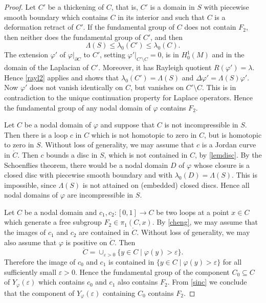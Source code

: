 \begin{proof}
Let $C'$ be a thickening of $C$,
that is, $C'$ is a domain in $S$ with piecewise smooth boundary
which contains $C$ in its interior and such that $C$ is a deformation retract of $C'$.
If the fundamental group of $C$ does not contain $F_2$,
then neither does the fundamental group of $C'$, and then
\begin{equation*}
  \Lambda(S) \le \lambda_0(C') \le \lambda_0(C).
\end{equation*}
The extension ${\varphi}'$ of ${\varphi}|_{\partial C}$ to $C'$, setting ${\varphi}'|_{C'\setminus C}=0$,
is in $H^1_0(M)$ and in the domain of the Laplacian of $C'$.
Moreover, it has Rayleigh quotient $R({\varphi}')=\lambda$.
Hence \cref{rayl2} applies and shows that $\lambda_0(C')=\Lambda(S)$
and $\Delta{\varphi}'=\Lambda(S){\varphi}'$.
Now ${\varphi}'$ does not vanish identically on $C$, but vanishes on $C'\setminus C$.
This is in contradiction to the unique continuation property for Laplace operators.
Hence the fundamental group of any nodal domain of ${\varphi}$ contains $F_2$.

Let $C$ be a nodal domain of ${\varphi}$ and suppose that $C$ is not incompressible in $S$.
Then there is a loop $c$ in $C$ which is not homotopic to zero in $C$,
but is homotopic to zero in $S$.
Without loss of generality, we may assume that $c$ is a Jordan curve in $\mathring C$.
Then $c$ bounds a disc in $S$, which is not contained in $C$, by \cref{lemdisc}.
By the Schoenflies theorem, there would be a nodal domain $D$ of ${\varphi}$
whose closure is a closed disc with piecewise smooth boundary
and with $\lambda_0(D)=\Lambda(S)$.
This is impossible, since $\Lambda(S)$ is not attained on (embedded) closed discs.
Hence all nodal domains of ${\varphi}$ are incompressible in $S$.

Let $C$ be a nodal domain and $c_1,c_2\colon[0,1]\to C$
be two loops at a point $x\in C$ which generate a free subgroup $F_2\in\pi_1(C,x)$.
By \cref{cheng},
we may assume that the images of $c_1$ and $c_2$ are contained in $\mathring C$.
Without loss of generality, we may also assume that ${\varphi}$ is positive on $\mathring C$.
Then
\begin{equation*}
  \mathring C=\cup_{{\varepsilon}>0}\{y\in C\mid{\varphi}(y)>{\varepsilon}\}.
\end{equation*}
Therefore the image of $c_0$ and $c_1$ is contained in $\{y\in C\mid{\varphi}(y)>{\varepsilon}\}$
for all sufficiently small ${\varepsilon}>0$.
Hence the fundamental group of the component $C_0\subseteq C$ of $Y_{\varphi}({\varepsilon})$
which contains $c_0$ and $c_1$ also contains $F_2$.
From \cref{sinc} we conclude that the component of $Y_{\varphi}({\varepsilon})$ containing $C_0$
contains $F_2$.
\end{proof}

